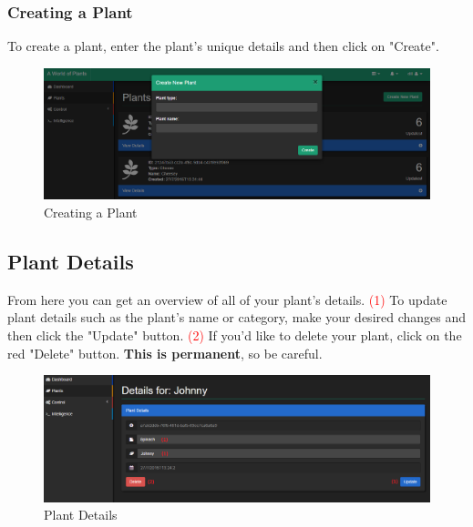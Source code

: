\documentclass{article}
\begin{document}
		\subsubsection{Creating a Plant}
		\label{sec:creating-a-plant}
		To create a plant, enter the plant's unique details and then click on "Create".
		\begin{figure}[H]
			\includegraphics[width=\textwidth]{../images/UserManual/create-plant.PNG}
			\caption{Creating a Plant}
		\end{figure}
		
	\subsection{Plant Details}
	\label{sec:plant-details}
	From here you can get an overview of all of your plant's details.
	\newline
	\textcolor{red}{(1)} To update plant details such as the plant's name or category, make your desired changes and then click the "Update" button.
	\newline
	\textcolor{red}{(2)} If you'd like to delete your plant, click on the red "Delete" button. \textbf{This is permanent}, so be careful.
	\begin{figure}[H]
		\includegraphics[width=\textwidth]{../images/UserManual/plant-details.PNG}
		\caption{Plant Details}
	\end{figure}
\end{document}
